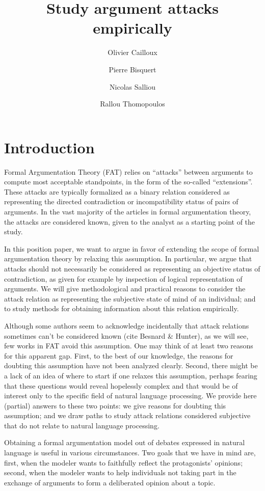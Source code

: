\documentclass[version=3.21, pagesize, twoside=off, bibliography=totoc, DIV=calc, fontsize=12pt, a4paper, french, english]{scrartcl}
\title{Study argument attacks empirically}
\author{Olivier Cailloux}
\affil{Université Paris-Dauphine, PSL Research University, CNRS, LAMSADE, 75016 PARIS, FRANCE\\
	\href{mailto:olivier.cailloux@dauphine.fr}{olivier.cailloux@dauphine.fr}
}
\author{Pierre Bisquert}
\affil{Affiliation}
\author{Nicolas Salliou}
\affil{Affiliation}
\author{Rallou Thomopoulos}
\affil{IATE, Univ Montpellier, INRAE, Institut Agro, MONTPELLIER, FRANCE\\
	\href{mailto:rallou.thomopoulos@inrae.fr}{rallou.thomopoulos@inrae.fr}
}
\begin{document}
\maketitle

\section{Introduction}
\label{sec:intro}
Formal Argumentation Theory (FAT) \cite{Dung95} relies on “attacks” between arguments to compute most acceptable standpoints, in the form of the so-called “extensions”. These attacks are typically formalized as a binary relation considered as representing the directed contradiction or incompatibility status of pairs of arguments. In the vast majority of the articles in formal argumentation theory, the attacks are considered known, given to the analyst as a starting point of the study. 

In this position paper, we want to argue in favor of extending the scope of formal argumentation theory by relaxing this assumption. In particular, we argue that attacks should not necessarily be considered as representing an objective status of contradiction, as given for example by inspection of logical representation of arguments. We will give methodological and practical reasons to consider the attack relation as representing the subjective state of mind of an individual; and to study methods for obtaining information about this relation empirically.

Although some authors seem to acknowledge incidentally that attack relations sometimes can’t be considered known (cite Besnard \& Hunter), as we will see, few works in FAT avoid this assumption. One may think of at least two reasons for this apparent gap. First, to the best of our knowledge, the reasons for doubting this assumption have not been analyzed clearly. Second, there might be a lack of an idea of where to start if one relaxes this assumption, perhaps fearing that these questions would reveal hopelessly complex and that would be of interest only to the specific field of natural language processing. We provide here (partial) answers to these two points: we give reasons for doubting this assumption; and we draw paths to study attack relations considered subjective that do not relate to natural language processing.

Obtaining a formal argumentation model out of debates expressed in natural language is useful in various circumstances. Two goals that we have in mind are, first, when the modeler wants to faithfully reflect the protagonists’ opinions; second, when the modeler wants to help individuals not taking part in the exchange of arguments to form a deliberated opinion about a topic. 
\end{document}
